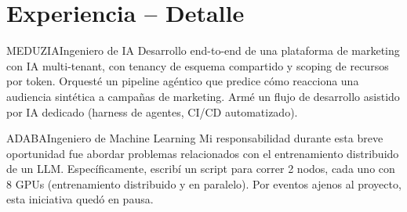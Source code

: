 {    \section{Experiencia -- Detalle}
        {MEDUZIA}{Ingeniero de IA}
        {Desarrollo end-to-end de una plataforma de marketing con IA multi-tenant, con tenancy de esquema compartido y scoping de recursos por token. Orquesté un pipeline agéntico que predice cómo reacciona una audiencia sintética a campañas de marketing. Armé un flujo de desarrollo asistido por IA dedicado (harness de agentes, CI/CD automatizado).\\[0.6em]
        }

        {ADABA}{Ingeniero de Machine Learning}
        {Mi responsabilidad durante esta breve oportunidad fue abordar problemas relacionados con el entrenamiento distribuido de un LLM. Específicamente, escribí un script para correr 2 nodos, cada uno con 8 GPUs (entrenamiento distribuido y en paralelo). Por eventos ajenos al proyecto, esta iniciativa quedó en pausa.\\[0.6em]
        }

}
